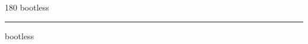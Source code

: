 
\begin{frame}
\begin{center}
\begin{turn}{180}
{\fontsize{2.5cm}{1em}\selectfont bootless}
\end{turn}
\vspace{1em}\par  
\hrule
\vspace{1em}\par  
{\fontsize{2.5cm}{1em}\selectfont bootless}
\end{center}
\end{frame}
